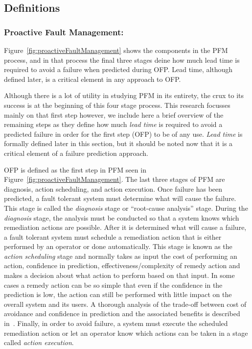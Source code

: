 \subsection{Definitions} \label{definitions}
\subsubsection{Proactive Fault Management:} \label{pfm}
Figure~\ref{fig:proactiveFaultManagement} shows the components in the PFM process, and in that process the final three stages deine how much lead time is required to avoid a failure when predicted during OFP. Lead time, although defined later, is a critical element in any approach to OFP.  

\figproactiveFaultManagement

Although there is a lot of utility in studying PFM in its entirety, the crux to its success is at the beginning of this four stage process.  This research focusses mainly on that first step however, we include here a brief overview of the remaining steps as they define how much \emph{lead time} is required to avoid a predicted failure in order for the first step (OFP) to be of any use.  \emph{Lead time} is formally defined later in this section, but it should be noted now that it is a critical element of a failure prediction approach.

OFP is defined as the first step in PFM seen in Figure~\ref{fig:proactiveFaultManagement}.  The last three stages of PFM are diagnosis, action scheduling, and action execution.  Once failure has been predicted, a fault tolerant system must determine what will cause the failure.  This stage is called the \emph{diagnosis} stage or ``root-cause analysis'' stage.  During the \emph{diagnosis} stage, the analysis must be conducted so that a system knows which remediation actions are possible.  After it is determined what will cause a failure, a fault tolerant system must schedule a remediation action that is either performed by an operator or done automatically.  This stage is known as the \emph{action scheduling} stage and normally takes as input the cost of performing an action, confidence in prediction, effectiveness/complexity of remedy action and makes a decision about what action to perform based on that input.  In some cases a remedy action can be so simple that even if the confidence in the prediction is low, the action can still be performed with little impact on the overall system and its users.  A thorough analysis of the trade-off between cost of avoidance and confidence in prediction and the associated benefits is described in~\cite{candea2004microreboot}.  Finally, in order to avoid failure, a system must execute the scheduled remediation action or let an operator know which actions can be taken in a stage called \emph{action execution}.


